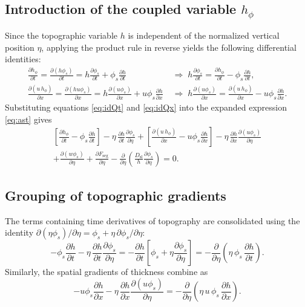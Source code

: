 \documentclass[lineno]{JFM-FLM_Au}
\begin{document}
\subsection{Introduction of the coupled variable $h_{\phi}$}
Since the topographic variable $h$ is independent of the normalized vertical position $\eta$, applying the product rule in reverse yields the following differential identities:
\begin{align}
    \frac{\partial h_{\phi}}{\partial t} = \frac{\partial (h\phi_s)}{\partial t} = h\frac{\partial \phi_s}{\partial t} + \phi_s\frac{\partial h}{\partial t}
    &\;\Longrightarrow\; h\frac{\partial \phi_s}{\partial t} = \frac{\partial h_{\phi}}{\partial t} - \phi_s\frac{\partial h}{\partial t}, \label{eq:idQt}\\
    \frac{\partial (u\,h_{\phi})}{\partial x} = \frac{\partial (hu\phi_s)}{\partial x} = h\frac{\partial (u\phi_s)}{\partial x} + u\phi_s\frac{\partial h}{\partial x}
    &\;\Longrightarrow\; h\frac{\partial (u\phi_s)}{\partial x} = \frac{\partial (u\,h_{\phi})}{\partial x} - u\phi_s\frac{\partial h}{\partial x}. \label{eq:idQx}
\end{align}
Substituting equations \eqref{eq:idQt} and \eqref{eq:idQx} into the expanded expression \eqref{eq:ast} gives
\begin{multline}
    \left[\frac{\partial h_{\phi}}{\partial t} - \phi_s\frac{\partial h}{\partial t}\right] - \eta\,\frac{\partial h}{\partial t}\frac{\partial \phi_s}{\partial \eta}
    + \left[\frac{\partial (u\,h_{\phi})}{\partial x} - u\phi_s\frac{\partial h}{\partial x}\right] - \eta\,\frac{\partial h}{\partial x}\frac{\partial (u\phi_s)}{\partial \eta} \\
    + \frac{\partial (w\phi_s)}{\partial \eta} + \frac{\partial F_{\mathrm{seg}}}{\partial \eta}
    - \frac{\partial}{\partial \eta}\!\left(\frac{D_{\mathrm{sl}}}{h}\frac{\partial \phi_s}{\partial \eta}\right) = 0.
    \label{eq:paso3}
\end{multline}

\subsection{Grouping of topographic gradients}
The terms containing time derivatives of topography are consolidated using the identity $\partial(\eta\phi_s)/\partial\eta = \phi_s + \eta\,\partial\phi_s/\partial\eta$:
\begin{equation}
    -\phi_s\frac{\partial h}{\partial t} - \eta\,\frac{\partial h}{\partial t}\frac{\partial \phi_s}{\partial \eta}
    = -\frac{\partial h}{\partial t}\left[\phi_s + \eta\frac{\partial \phi_s}{\partial \eta}\right]
    = -\frac{\partial}{\partial \eta}\!\left(\eta\,\phi_s\,\frac{\partial h}{\partial t}\right).
    \label{eq:grupo_t}
\end{equation}
Similarly, the spatial gradients of thickness combine as
\begin{equation}
    -u\phi_s\frac{\partial h}{\partial x} - \eta\,\frac{\partial h}{\partial x}\frac{\partial (u\phi_s)}{\partial \eta}
    = -\frac{\partial}{\partial \eta}\!\left(\eta\,u\,\phi_s\,\frac{\partial h}{\partial x}\right).
    \label{eq:grupo_x}
\end{equation}
\end{document}
